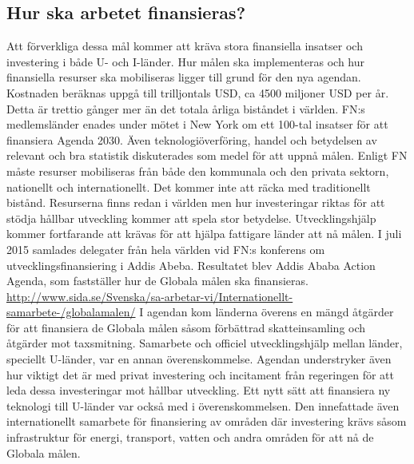 \documentclass{report}
\begin{document}
\subsection{Hur ska arbetet finansieras?} 
Att förverkliga dessa mål kommer att kräva stora finansiella insatser och  investering i både U- och I-länder. \cite{web2030agenda}
Hur målen ska implementeras och hur finansiella resurser ska mobiliseras ligger till grund för den nya agendan. \cite{webUNASweden}
Kostnaden beräknas uppgå till trilljontals USD, \cite{web2030agenda} ca 4500 miljoner USD per år. Detta är trettio gånger mer än det totala årliga biståndet i världen. \cite{webUNICEF} FN:s medlemsländer enades under mötet i New York om ett 100-tal insatser för att finansiera Agenda 2030. Även teknologiöverföring, handel och betydelsen av relevant och bra statistik diskuterades som medel för att uppnå målen. \cite{webUNASweden}
Enligt FN måste resurser mobiliseras från både den kommunala och den privata sektorn, nationellt och internationellt. Det kommer inte att räcka med traditionellt bistånd. Resurserna finns redan i världen men hur investeringar riktas för att stödja hållbar utveckling kommer att spela stor betydelse. Utvecklingshjälp kommer fortfarande att krävas för att hjälpa fattigare länder att nå målen. 
\cite{web2030agenda}
I juli 2015 samlades delegater från hela världen vid FN:s konferens om utvecklingsfinansiering i Addis Abeba. Resultatet blev Addis Ababa Action Agenda, som fastställer hur de Globala målen ska finansieras. \url { http://www.sida.se/Svenska/sa-arbetar-vi/Internationellt-samarbete-/globalamalen/}
I agendan kom länderna överens en mängd åtgärder för att finansiera de Globala målen såsom förbättrad skatteinsamling och åtgärder mot taxsmitning. Samarbete och officiel utvecklingshjälp mellan länder, speciellt U-länder, var en annan överenskommelse. Agendan understryker även hur viktigt det är med privat investering och incitament från regeringen för att leda dessa investeringar mot hållbar utveckling. Ett nytt sätt att finansiera ny teknologi till U-länder var också med i överenskommelsen. Den innefattade även internationellt samarbete för finansiering av områden där investering krävs såsom infrastruktur för energi, transport, vatten och andra områden för att nå de Globala målen.  
\cite{webUNDESA}\\
\end{document}
